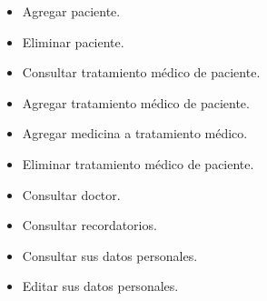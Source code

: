 \begin{itemize}
\begin{itemize}
		
		\item Agregar paciente.
		\item Eliminar paciente.
		\item Consultar tratamiento médico de paciente.
		\item Agregar tratamiento médico de paciente.
		\item Agregar medicina a tratamiento médico.
		\item Eliminar tratamiento médico de paciente.
		\item Consultar doctor.
		\item Consultar recordatorios.
		\item Consultar sus datos personales.
		\item Editar sus datos personales.
%		
	\end{itemize}
\end{itemize}


